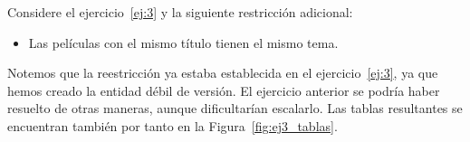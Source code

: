 \begin{ejercicio} \label{ej:4}
    Considere el ejercicio~\ref{ej:3} y la siguiente restricción adicional:
    \begin{itemize}
        \item Las películas con el mismo título tienen el mismo tema.
    \end{itemize}

    Notemos que la reestricción ya estaba establecida en el ejercicio~\ref{ej:3}, ya que hemos creado la entidad débil de versión.
    El ejercicio anterior se podría haber resuelto de otras maneras, aunque dificultarían escalarlo.
    Las tablas resultantes se encuentran también por tanto en la Figura~\ref{fig:ej3_tablas}.

\end{ejercicio}

